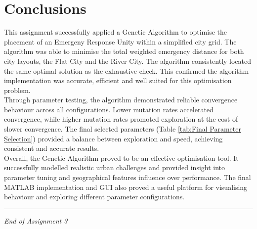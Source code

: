 \documentclass[12pt,a4paper]{article}
\begin{document}
\section{Conclusions}
This assignment successfully applied a Genetic Algorithm to optimise the placement of an Emergeny Response Unity within a simplified city grid. The algorithm was able to minimise the total weighted emergency distance for both city layouts, the Flat City and the River City. The algorithm consistently located the same optimal solution as the exhaustive check. This confirmed the algorithm implementation was accurate, efficient and well suited for this optimisation problem.\\

Through parameter testing, the algorithm demonstrated reliable convergence behaviour across all configurations. Lower mutation rates accelerated convergence, while higher mutation rates promoted exploration at the cost of slower convergence. The final selected parameters (Table \ref{tab:Final Parameter Selection}) provided a balance between exploration and speed, achieving consistent and accurate results.\\

Overall, the Genetic Algorithm proved to be an effective optimisation tool. It successfully modelled realistic urban challenges and provided insight into parameter tuning and geographical features influence over performance. The final MATLAB implementation and GUI also proved a useful platform for visualising behaviour and exploring different parameter configurations.
\vfill
\hrule
\begin{center}
\textit{End of Assignment 3}
\end{center}
\end{document}
